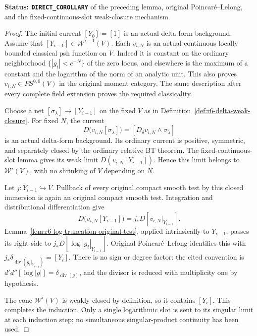 \documentclass[11pt,a4paper]{article}
\numberwithin{equation}{section}
\theoremstyle{definition}
\theoremstyle{remark}
\begin{document}
\noindent\textbf{Status: \texttt{DIRECT\_COROLLARY}} of
the preceding lemma, original Poincar\'e--Lelong, and the
fixed-continuous-slot weak-closure mechanism.

\begin{proof}
The initial current $[Y_0]=[1]$ is an actual delta-form background.
Assume that $[Y_{i-1}]\in\mathcal W^{i-1}(V)$.  Each $v_{i,N}$
is an actual continuous locally bounded classical psh function on
$V$.  Indeed it is constant on the ordinary neighborhood
$\{|g_i|<e^{-N}\}$ of the zero locus, and elsewhere is the maximum
of a constant and the logarithm of the norm of an analytic unit.
This also proves $v_{i,N}\in PS^{0,0}(V)$ in the original moment
category.  The same description after every complete field extension
proves the required classicality.

Choose a net $[\sigma_\lambda]\to[Y_{i-1}]$ on the fixed $V$
as in Definition~\ref{def:r6-delta-weak-closure}.  For fixed $N$,
the current
\[
 D\bigl(v_{i,N}[\sigma_\lambda]\bigr)
           =[D_\delta v_{i,N}\wedge\sigma_\lambda]
\]
is an actual delta-form background.  Its ordinary current is
positive, symmetric, and separately closed by the ordinary
relative BT theorem.  The fixed-continuous-slot lemma gives its
weak limit $D(v_{i,N}[Y_{i-1}])$.  Hence this limit belongs to
$\mathcal W^i(V)$, with no shrinking of $V$ depending on $N$.

Let $j:Y_{i-1}\hookrightarrow V$.  Pullback of every original
compact smooth test by this closed immersion is again an original
compact smooth test.  Integration and distributional differentiation
give
\[
 D\bigl(v_{i,N}[Y_{i-1}]\bigr)
               =j_*D[v_{i,N}|_{Y_{i-1}}].
\]
Lemma~\ref{lem:r6-log-truncation-original-test}, applied intrinsically
to $Y_{i-1}$, passes its right side to
$j_*D[\log|g_i|_{Y_{i-1}}]$.  Original
Poincar\'e--Lelong
\cite[Theorem 4.6.5, printed p.~74]{CLD12} identifies this with
$j_*\delta_{\operatorname{div}(g_i|_{Y_{i-1}})}=[Y_i]$.
There is no sign or degree factor: the cited convention is
$d'd''[\log|g|]=\delta_{\operatorname{div}(g)}$, and the divisor
is reduced with multiplicity one by hypothesis.

The cone $\mathcal W^i(V)$ is weakly closed by definition, so it
contains $[Y_i]$.  This completes the induction.  Only a single
logarithmic slot is sent to its singular limit at each induction
step; no simultaneous singular-product continuity has been used.
\end{proof}
\end{document}
